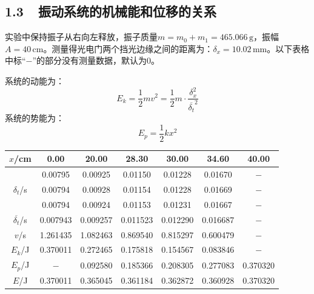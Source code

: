 \documentclass[a4paper,fontset=windows]{ctexart}
\begin{document}
\newpage
\subsection*{ 1.3\ \ 振动系统的机械能和位移的关系}

实验中保持振子从右向左释放，振子质量$m = m_0 + m_1 = 465.066\,\mathrm{g}$，振幅$A = 40\,\mathrm{cm}$。测量得光电门两个挡光边缘之间的距离为：$\delta_x = 10.02\,\mathrm{mm}$。以下表格中标“$-$”的部分没有测量数据，默认为0。

系统的动能为：
\[
    E_k = \frac{1}{2}mv^2 = \frac{1}{2}m\cdot\frac{\delta_x^2}{\overline{\delta_t}^2}
\]
系统的势能为：
\[
    E_p = \frac{1}{2}kx^2
\]

\vspace{0.5em}
\begin{table}[ht!]\Large
    \begin{center}
        \begin{tabular}{ |c|c|c|c|c|c|c| }
            \hline
            $x$/cm & 0.00 & 20.00 & 28.30 & 30.00 & 34.60 & 40.00 \\
            \hline
            \multirow{3}{*}{$\delta_t$/s} & 0.00795 & 0.00925 & 0.01150 & 0.01228 & 0.01670 & $-$ \\
            \cline{2-7}
            & 0.00794 & 0.00928 & 0.01154 & 0.01228 & 0.01669 & $-$ \\
            \cline{2-7}
            & 0.00794 & 0.00924 & 0.01153 & 0.01231 & 0.01667 & $-$ \\
            \hline
            $\overline{\delta_t}$/s & 0.007943 & 0.009257 & 0.011523 & 0.012290 & 0.016687 & $-$ \\
            \hline
            $v$/s & 1.261435 & 1.082463 & 0.869540 & 0.815297 & 0.600479 & $-$ \\
            \hline
            $E_k$/J & 0.370011 & 0.272465 & 0.175818 & 0.154567 & 0.083846 & $-$ \\
            \hline
            $E_p$/J & $-$ & 0.092580 & 0.185366 & 0.208305 & 0.277083 & 0.370320 \\
            \hline
            $E$/J & 0.370011 & 0.365045 & 0.361184 & 0.362872 & 0.360928 & 0.370320 \\
            \hline
        \end{tabular}
    \end{center}
\end{table}
\end{document}
